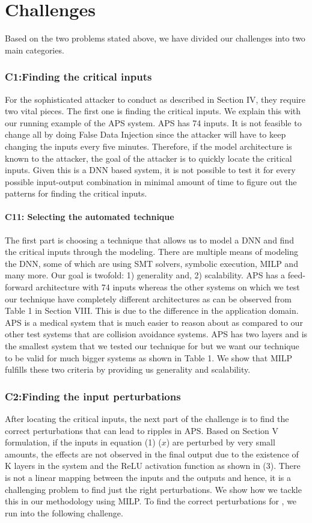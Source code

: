 \chapter{Challenges}
Based on the two problems stated above, we have divided our challenges into two main categories. 
\subsection*{\textbf{C1}:Finding the critical inputs}
For the sophisticated attacker to conduct \attack as described in Section IV, they require two vital pieces. The first one is finding the critical inputs. We explain this with our running example of the APS system. APS has 74 inputs. It is not feasible to change all by doing False Data Injection since the attacker will have to keep changing the inputs every five minutes. Therefore, if the model architecture is known to the attacker, the goal of the attacker is to quickly locate the critical inputs. Given this is a DNN based system, it is not possible to test it for every possible input-output combination in minimal amount of time to figure out the patterns for finding the critical inputs. 

\subsubsection*{\textbf{C11}: Selecting  the automated technique}
The first part is choosing a technique that allows us to model a DNN and find the critical inputs through the modeling. There are multiple means of modeling the DNN, some of which are using SMT solvers, symbolic execution, MILP and many more. Our goal is twofold: 1) generality and, 2) scalability. APS has a  feed-forward architecture with 74 inputs whereas the other systems on which we test our technique have completely different architectures as can be observed from Table 1 in Section VIII. This is due to the difference in the application domain. APS is a medical system that is much easier to reason about as compared to our other test systems that are collision avoidance systems.
APS has two layers and is the smallest system that we tested our technique for but we want our technique to be valid for much bigger systems as shown in Table 1. We show that MILP fulfills these two criteria by providing us generality and scalability. 


\subsection*{\textbf{C2}:Finding the input perturbations}
After locating the critical inputs, the next part of the challenge is to find the correct perturbations that can lead to ripples in APS. Based on Section V formulation, if the inputs in equation (1) ($x$) are perturbed by very small amounts, the effects are not observed in the final output due to the existence of K layers in the system and the ReLU activation function as shown in (3). There is not a linear mapping between the inputs and the outputs and hence, it is a challenging problem to find just the right perturbations. We show how we tackle this in our methodology using MILP. To find the correct perturbations for \attack, we run into the following challenge. 

